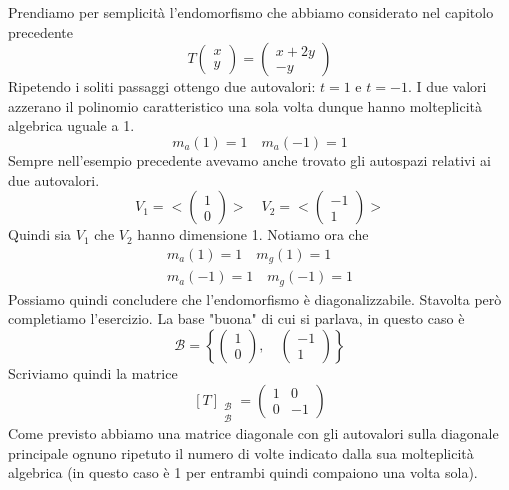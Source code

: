 \begin{example}
	Prendiamo per semplicit\`a l'endomorfismo che abbiamo considerato nel capitolo precedente
	\[
		T \begin{pmatrix} x \\ y \end{pmatrix} =
		\begin{pmatrix}
			x + 2y \\
			-y
		\end{pmatrix}
	\]
	Ripetendo i soliti passaggi ottengo due autovalori: $t = 1$ e $t = -1$.
	I due valori azzerano il polinomio caratteristico una sola volta dunque hanno
	molteplicit\`a algebrica uguale a 1.
	\[ m_a(1) = 1 \quad m_a(-1) = 1 \]
	Sempre nell'esempio precedente avevamo anche trovato gli autospazi relativi ai due
	autovalori.
	\[
		V_1 = < \begin{pmatrix} 1 \\ 0 \end{pmatrix} > \quad
		V_2 = < \begin{pmatrix} -1 \\ 1 \end{pmatrix} >
	\]
	Quindi sia $V_1$ che $V_2$ hanno dimensione 1. Notiamo ora che 
	\begin{gather*}
		m_a(1) = 1 \quad m_g(1) = 1 \\
		m_a(-1) = 1 \quad m_g(-1) = 1
	\end{gather*}
	Possiamo quindi concludere che l'endomorfismo \`e diagonalizzabile. Stavolta per\`o
	completiamo l'esercizio. La base "buona" di cui si parlava, in questo caso \`e
	\[
		\mathcal{B} = \left\{
		\begin{pmatrix} 1 \\ 0 \end{pmatrix}, \quad
		\begin{pmatrix} -1 \\ 1	\end{pmatrix}
		\right\}
	\]
	Scriviamo quindi la matrice
	\[
		[T]_{\substack{\mathcal{B} \\ \mathcal{B}}} = 
		\begin{pmatrix}
			1 & 0  \\
			0 & -1
		\end{pmatrix}
	\]
	Come previsto abbiamo una matrice diagonale con gli autovalori sulla diagonale principale
	ognuno ripetuto il numero di volte indicato dalla sua molteplicit\`a algebrica (in questo
	caso \`e 1 per entrambi quindi compaiono una volta sola).
\end{example}